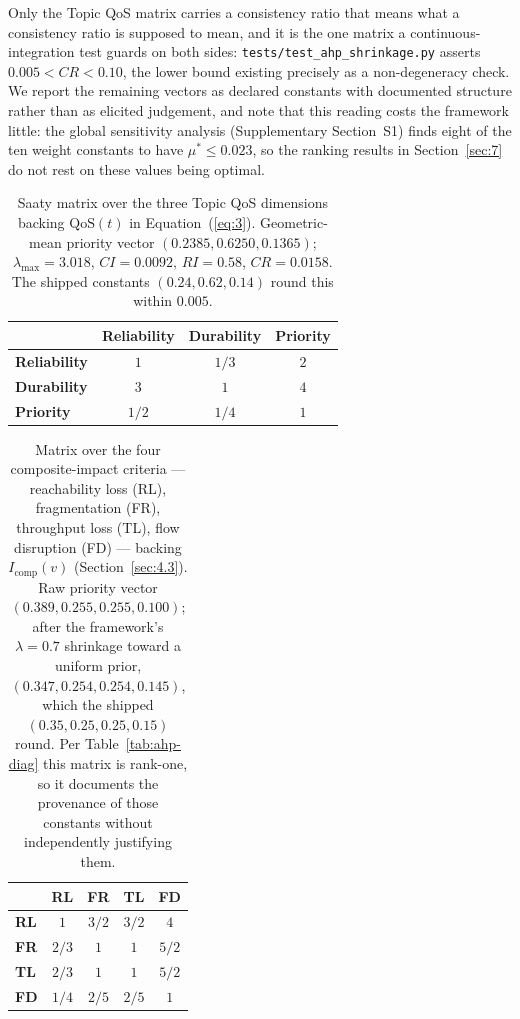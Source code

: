 \noindent Only the Topic QoS matrix carries a consistency ratio that means what a consistency ratio is supposed to mean, and it is the one matrix a continuous-integration test guards on both sides: \texttt{tests/test\_ahp\_shrinkage.py} asserts $0.005 < CR < 0.10$, the lower bound existing precisely as a non-degeneracy check. We report the remaining vectors as declared constants with documented structure rather than as elicited judgement, and note that this reading costs the framework little: the global sensitivity analysis (Supplementary Section~S1) finds eight of the ten weight constants to have $\mu^* \le 0.023$, so the ranking results in Section~\ref{sec:7} do not rest on these values being optimal.

\begin{table}[htbp]
\centering
\small
\caption{Saaty matrix over the three Topic QoS dimensions backing $\text{QoS}(t)$ in Equation~(\ref{eq:3}). Geometric-mean priority vector $(0.2385, 0.6250, 0.1365)$; $\lambda_{\max} = 3.018$, $CI = 0.0092$, $RI = 0.58$, $CR = 0.0158$. The shipped constants $(0.24, 0.62, 0.14)$ round this within $0.005$.}
\label{tab:ahp-qos}
\begin{tabular}{lccc}
\toprule
 & \textbf{Reliability} & \textbf{Durability} & \textbf{Priority} \\
\midrule
\textbf{Reliability} & $1$ & $1/3$ & $2$ \\
\textbf{Durability} & $3$ & $1$ & $4$ \\
\textbf{Priority} & $1/2$ & $1/4$ & $1$ \\
\bottomrule
\end{tabular}
\end{table}

\begin{table}[htbp]
\centering
\small
\caption{Matrix over the four composite-impact criteria --- reachability loss (RL), fragmentation (FR), throughput loss (TL), flow disruption (FD) --- backing $I_{\text{comp}}(v)$ (Section~\ref{sec:4.3}). Raw priority vector $(0.389, 0.255, 0.255, 0.100)$; after the framework's $\lambda = 0.7$ shrinkage toward a uniform prior, $(0.347, 0.254, 0.254, 0.145)$, which the shipped $(0.35, 0.25, 0.25, 0.15)$ round. Per Table~\ref{tab:ahp-diag} this matrix is rank-one, so it documents the provenance of those constants without independently justifying them.}
\label{tab:ahp-impact}
\begin{tabular}{lcccc}
\toprule
 & \textbf{RL} & \textbf{FR} & \textbf{TL} & \textbf{FD} \\
\midrule
\textbf{RL} & $1$ & $3/2$ & $3/2$ & $4$ \\
\textbf{FR} & $2/3$ & $1$ & $1$ & $5/2$ \\
\textbf{TL} & $2/3$ & $1$ & $1$ & $5/2$ \\
\textbf{FD} & $1/4$ & $2/5$ & $2/5$ & $1$ \\
\bottomrule
\end{tabular}
\end{table}
